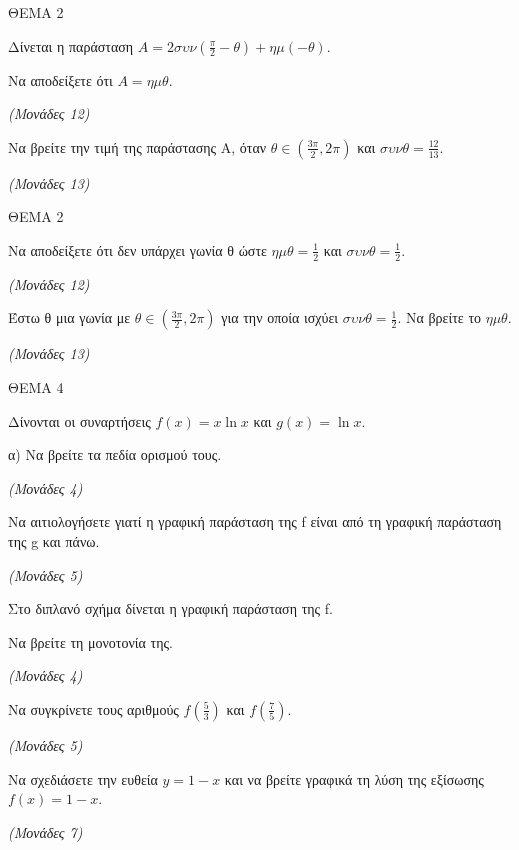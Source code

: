 \documentclass[11pt,a4paper,twoside]{book}
\newcommand{\monades}[1]{\hfill \textit{(Μονάδες #1)}}
\begin{document}
ΘΕΜΑ 2

Δίνεται η παράσταση $A = 2\sigma\upsilon\nu\left(\frac{\pi}{2} - \theta\right) + \eta\mu(-\theta)$.

\begin{alist}
\item Να αποδείξετε ότι $A = \eta\mu\theta$.

\monades{12}

\item Να βρείτε την τιμή της παράστασης Α, όταν $\theta \in \left(\frac{3\pi}{2}, 2\pi\right)$ και $\sigma\upsilon\nu\theta = \frac{12}{13}$.

\monades{13}
\end{alist}

\vspace{4mm}

ΘΕΜΑ 2

\begin{alist}
\item Να αποδείξετε ότι δεν υπάρχει γωνία θ ώστε $\eta\mu\theta = \frac{1}{2}$ και $\sigma\upsilon\nu\theta = \frac{1}{2}$.

\monades{12}

\item Έστω θ μια γωνία με $\theta \in \left(\frac{3\pi}{2}, 2\pi\right)$ για την οποία ισχύει $\sigma\upsilon\nu\theta = \frac{1}{2}$. Να βρείτε το $\eta\mu\theta$.

\monades{13}
\end{alist}

\vspace{4mm}

ΘΕΜΑ 4

Δίνονται οι συναρτήσεις $f(x) = x \ln x$ και $g(x) = \ln x$.

α) Να βρείτε τα πεδία ορισμού τους.

\monades{4}

\begin{alist}
\item Να αιτιολογήσετε γιατί η γραφική παράσταση της f είναι από τη γραφική παράσταση της g και πάνω.

\monades{5}

Στο διπλανό σχήμα δίνεται η γραφική παράσταση της f.

\begin{rlist}
\item Να βρείτε τη μονοτονία της.

\monades{4}

\item Να συγκρίνετε τους αριθμούς $f\left(\frac{5}{3}\right)$ και $f\left(\frac{7}{5}\right)$.

\monades{5}

\end{rlist}
\item Να σχεδιάσετε την ευθεία $y = 1 - x$ και να βρείτε γραφικά τη λύση της εξίσωσης $f(x) = 1 - x$.

\monades{7}
\end{alist}
\end{document}
